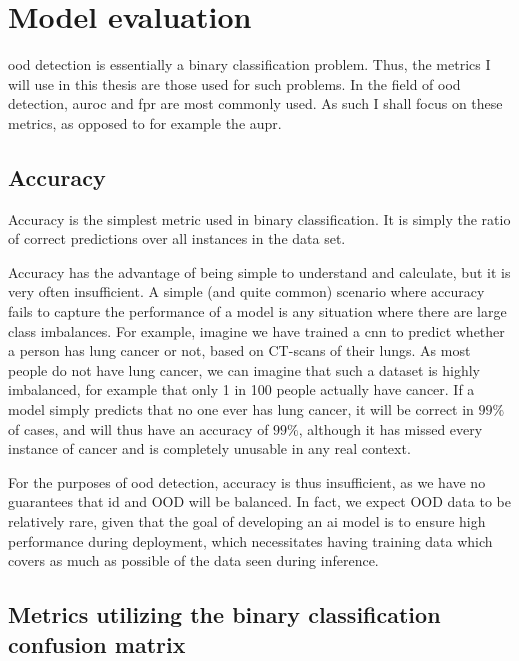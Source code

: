 \documentclass[UKenglish]{uiomasterthesis} %
\theoremstyle{definition}
\begin{document}
\section{Model evaluation}

\ac{ood} detection is essentially a binary classification problem. Thus, the metrics I will use in this thesis are those used for such problems. In the field of \ac{ood} detection, \ac{auroc} and \ac{fpr} are most commonly used. As such I shall focus on these metrics, as opposed to for example the \ac{aupr}.

\subsection{Accuracy}

Accuracy is the simplest metric used in binary classification. It is simply the ratio of correct predictions over all instances in the data set. %


Accuracy has the advantage of being simple to understand and calculate, but it is very often insufficient. A simple (and quite common) scenario where accuracy fails to capture the performance of a model is any situation where there are large class imbalances. For example, imagine we have trained a \ac{cnn} to predict whether a person has lung cancer or not, based on CT-scans of their lungs. As most people do not have lung cancer, we can imagine that such a dataset is highly imbalanced, for example that only 1 in 100 people actually have cancer. If a model simply predicts that no one ever has lung cancer, it will be correct in $99\%$ of cases, and will thus have an accuracy of $99\%$, although it has missed every instance of cancer and is completely unusable in any real context.

For the purposes of \ac{ood} detection, accuracy is thus insufficient, as we have no guarantees that \ac{id} and OOD will be balanced. In fact, we expect OOD data to be relatively rare, given that the goal of developing an \ac{ai} model is to ensure high performance during deployment, which necessitates having training data which covers as much as possible of the data seen during inference.

\subsection{Metrics utilizing the binary classification confusion matrix} \label{section:aurocfpr95}
\end{document}
